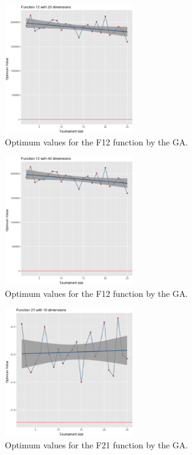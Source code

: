 \begin{figure}[H]
	\includegraphics[width=0.5\textwidth]{img/12dim_20.ps}
	\caption{Optimum values for the F12 function by the GA.}
	\label{12dim_20}
\end{figure}

\begin{figure}[H]
	\includegraphics[width=0.5\textwidth]{img/12dim_40.ps}
	\caption{Optimum values for the F12 function by the GA.}
	\label{12dim_40}
\end{figure}



\begin{figure}[H]
	\includegraphics[width=0.5\textwidth]{img/21dim_10.ps}
	\caption{Optimum values for the F21 function by the GA.}
	\label{21dim_10}
\end{figure}

